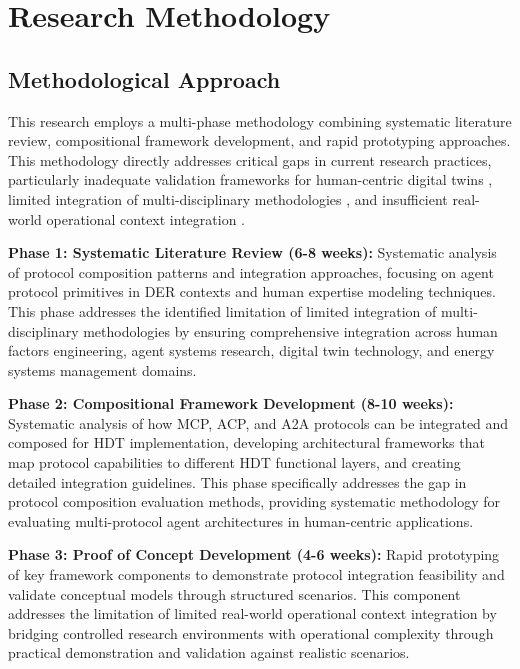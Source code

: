 \documentclass[12pt,a4paper]{article}
\begin{document}
\section{Research Methodology}
\label{sec:methodology}

\subsection{Methodological Approach}

This research employs a multi-phase methodology combining systematic literature review, compositional framework development, and rapid prototyping approaches. This methodology directly addresses critical gaps in current research practices, particularly inadequate validation frameworks for human-centric digital twins \cite{10.1109/etfa61755.2024.10711109}, limited integration of multi-disciplinary methodologies \cite{10.1016/j.ifacol.2022.09.675}, and insufficient real-world operational context integration \cite{10.1007/s10207-023-00784-x}.

\textbf{Phase 1: Systematic Literature Review (6-8 weeks):} Systematic analysis of protocol composition patterns and integration approaches, focusing on agent protocol primitives in DER contexts and human expertise modeling techniques. This phase addresses the identified limitation of limited integration of multi-disciplinary methodologies by ensuring comprehensive integration across human factors engineering, agent systems research, digital twin technology, and energy systems management domains.

\textbf{Phase 2: Compositional Framework Development (8-10 weeks):} Systematic analysis of how MCP, ACP, and A2A protocols can be integrated and composed for HDT implementation, developing architectural frameworks that map protocol capabilities to different HDT functional layers, and creating detailed integration guidelines. This phase specifically addresses the gap in protocol composition evaluation methods, providing systematic methodology for evaluating multi-protocol agent architectures in human-centric applications.

\textbf{Phase 3: Proof of Concept Development (4-6 weeks):} Rapid prototyping of key framework components to demonstrate protocol integration feasibility and validate conceptual models through structured scenarios. This component addresses the limitation of limited real-world operational context integration by bridging controlled research environments with operational complexity through practical demonstration and validation against realistic scenarios.
\end{document}
